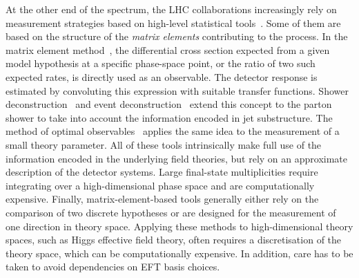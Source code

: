 At the other end of the spectrum, the LHC collaborations increasingly
rely on measurement strategies based on high-level statistical
tools~\cite{cranmer:nips2016}. Some of them are based on the structure
of the \emph{matrix elements} contributing to the process. In the
matrix element method~\cite{Kondo:1988yd, Abazov:2004cs, Gao:2010qx,
  Alwall:2010cq, Avery:2012um, Andersen:2012kn, Campbell:2013hz,
  Artoisenet:2013vfa, Martini:2015fsa, Gritsan:2016hjl}, the
differential cross section expected from a given model hypothesis at a
specific phase-space point, or the ratio of two such expected rates,
is directly used as an observable. The detector response is estimated
by convoluting this expression with suitable transfer
functions. Shower deconstruction~\cite{Soper:2011cr, Soper:2012pb} and
event deconstruction~\cite{Soper:2014rya} extend this concept to the
parton shower to take into account the information encoded in jet
substructure. The method of optimal observables~\cite{Atwood:1991ka,
  Davier:1992nw, Diehl:1993br} applies the same idea to the
measurement of a small theory parameter. All of these tools intrinsically
make full use of the information encoded in the underlying field
theories, but rely on an approximate description of the detector
systems. Large final-state multiplicities require integrating over a
high-dimensional phase space and are computationally
expensive. Finally, matrix-element-based tools generally either rely
on the comparison of two discrete hypotheses or are designed for the
measurement of one direction in theory space. Applying these methods
to high-dimensional theory spaces, such as Higgs effective field
theory, often requires a discretisation of the theory space, which can
be computationally expensive. In addition, care has to be taken to
avoid dependencies on EFT basis choices.

